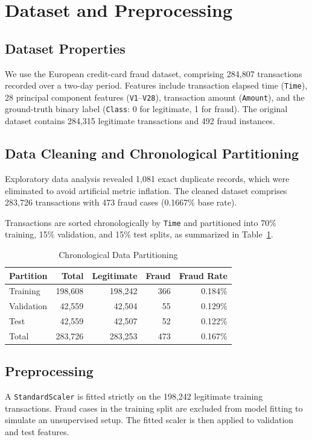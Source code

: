 \documentclass[conference]{IEEEtran}
\begin{document}
\section{Dataset and Preprocessing}
\subsection{Dataset Properties}
We use the European credit-card fraud dataset, comprising 284,807 transactions recorded over a two-day period. Features include transaction elapsed time (\texttt{Time}), 28 principal component features (\texttt{V1}--\texttt{V28}), transaction amount (\texttt{Amount}), and the ground-truth binary label (\texttt{Class}: 0 for legitimate, 1 for fraud). The original dataset contains 284,315 legitimate transactions and 492 fraud instances.

\subsection{Data Cleaning and Chronological Partitioning}
Exploratory data analysis revealed 1,081 exact duplicate records, which were eliminated to avoid artificial metric inflation. The cleaned dataset comprises 283,726 transactions with 473 fraud cases (0.1667\% base rate).

Transactions are sorted chronologically by \texttt{Time} and partitioned into 70\% training, 15\% validation, and 15\% test splits, as summarized in Table~\ref{tab:split}.

\begin{table}[h]
\caption{Chronological Data Partitioning}
\label{tab:split}
\centering
\small
\begin{tabular}{lrrrr}
\toprule
Partition & Total & Legitimate & Fraud & Fraud Rate\\
\midrule
Training & 198,608 & 198,242 & 366 & 0.184\%\\
Validation & 42,559 & 42,504 & 55 & 0.129\%\\
Test & 42,559 & 42,507 & 52 & 0.122\%\\
\midrule
Total & 283,726 & 283,253 & 473 & 0.167\%\\
\bottomrule
\end{tabular}
\end{table}

\subsection{Preprocessing}
A \texttt{StandardScaler} is fitted strictly on the 198,242 legitimate training transactions. Fraud cases in the training split are excluded from model fitting to simulate an unsupervised setup. The fitted scaler is then applied to validation and test features.
\end{document}
